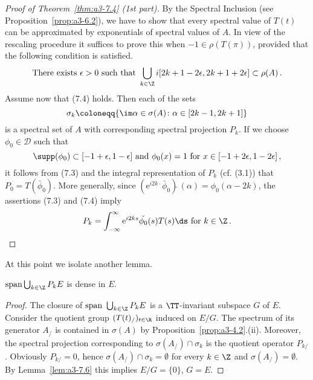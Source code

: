 \begin{proof}[Proof of Theorem~\ref{thm:a3-7.4} (1st part)]
By the Spectral Inclusion (see Proposition~\ref{prop:a3-6.2}), we have to show that every spectral value of $T(t)$ can be approximated by exponentials of spectral values of $A$.
In view of the rescaling procedure it suffices to prove this when $-1 \in \rho(T(\pi))$, provided that the following condition is satisfied.
\begin{equation}\label{eq:a3-7.5}
\text{There exists } \epsilon > 0 \text{ such that } \bigcup_{k\in\Z} i[2k+1-2\epsilon,2k+1+2\epsilon] \subset \rho(A)\,.
\end{equation}
Assume now that (7.4) holds.
Then each of the sets 
\[
\sigma_{k}\coloneqq \{\im\alpha \in \sigma(A) \colon \alpha \in [2k-1,2k+1]\}
\] 
is a spectral set of $A$ with corresponding spectral projection $P_{k}$.
If we choose $\phi_{0} \in \mathcal{D}$ such that 
\[
\supp(\phi_{0}) \subset [-1+\epsilon,1-\epsilon] \text{ and } \phi_{0}(x) = 1 \text{ for } x \in [-1+2\epsilon,1-2\epsilon]\,,
\]
it follows from (7.3) and the integral representation of $P_{k}$ (cf. (3.1)) that $P_{0} = T(\check{\phi_{0}})$.
More generally, since $\left(\mathrm{e}^{i2k\cdot}\check{\phi_{0}}\right){\hat{ }}\,(\alpha) = \phi_{0}(\alpha-2k)$, the assertions (7.3) and (7.4) imply
\begin{equation}\label{eq:a3-7.5}
P_{k} = \int_{-\infty}^{\infty} \mathrm{e}^{i2ks}\check{\phi_{0}}(s)T(s)\ds \text{ for } k \in \Z\,.
\end{equation}
\end{proof}
At this point we isolate another lemma.
\begin{lemma}\label{lem:a3-7.7}
$\mathrm{span }\bigcup_{k\in\Z} P_{k}E$ is dense in $E$.
\end{lemma}
\begin{proof}
The closure of $\text{span }\bigcup_{k\in\Z} P_{k}E$ is a $\TT$-invariant subspace $G$ of $E$.
Consider the quotient group $(T(t)_/)_{t\in\R}$ induced on $E/G$.
The spectrum of its generator $A_{/}$ is contained in $\sigma(A)$ by Proposition~\ref{prop:a3-4.2}.(ii).
Moreover, the spectral projection corresponding to $\sigma(A_{/}) \cap \sigma_{k}$ is the quotient operator $P_{k/}$.
Obviously $P_{k/} = 0$, hence $\sigma(A_{/}) \cap \sigma_{k} = \emptyset$ for every $k \in \Z$ and $\sigma(A_{/}) = \emptyset$.
By Lemma~\ref{lem:a3-7.6} this implies $E/G = \{0\}$, \ie $G = E$.
\end{proof}
